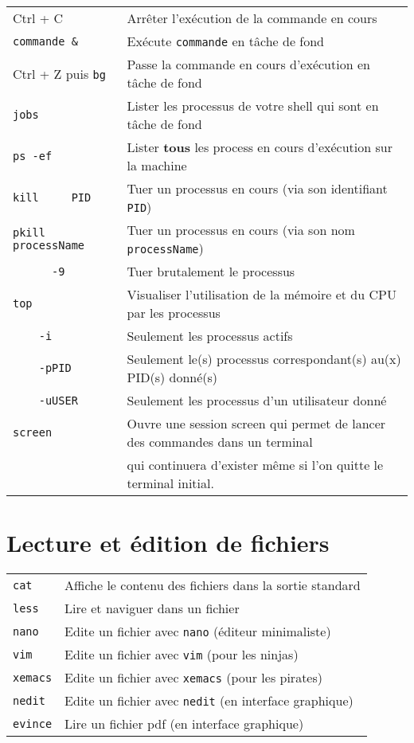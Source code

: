 \documentclass [a4paper]{article}
\begin{document}
\noindent
\begin{tabular}{ ll }
\hline
{Ctrl + C}                    & Arrêter l'exécution de la commande en cours \\
\verb+commande &+             & Exécute \verb+commande+ en tâche de fond \\
{Ctrl + Z puis \verb+bg+}     & Passe la commande en cours d'exécution en tâche de fond \\
{\verb+jobs+}                 & Lister les processus de votre shell qui sont en tâche de fond \\
{\verb+ps -ef+}               & Lister \textbf{tous} les process en cours d'exécution sur la machine \\
{\verb+kill     PID+}         & Tuer un processus en cours (via son identifiant \verb+PID+)\\
{\verb+pkill    processName+} & Tuer un processus en cours (via son nom \verb+processName+)\\
{\verb+      -9  + }          & Tuer brutalement le processus\\
{\verb+top+}                  & Visualiser l'utilisation de la mémoire et du CPU par les processus\\
{\verb+    -i +}              & Seulement les processus actifs\\
{\verb+    -pPID+}            & Seulement le(s) processus correspondant(s) au(x) PID(s) donné(s)\\
{\verb+    -uUSER+}           & Seulement les processus d'un utilisateur donné\\
{\verb+screen+}               & Ouvre une session screen qui permet de lancer des commandes dans un terminal \\
                              & qui continuera d'exister même si l'on quitte le terminal initial.\\
\hline
\end{tabular}


\section*{Lecture et édition de fichiers}

\noindent
\begin{tabular}{ ll }
\hline
{\verb+cat+}    & Affiche le contenu des fichiers dans la sortie standard\\
{\verb+less+}   & Lire et naviguer dans un fichier\\
{\verb+nano+}   & Edite un fichier avec \verb+nano+ (éditeur minimaliste)\\
{\verb+vim+}    & Edite un fichier avec \verb+vim+ (pour les ninjas)\\
{\verb+xemacs+} & Edite un fichier avec \verb+xemacs+ (pour les pirates)\\
{\verb+nedit+}  & Edite un fichier avec \verb+nedit+ (en interface graphique)\\
{\verb+evince+} & Lire un fichier pdf (en interface graphique)\\
\hline
\end{tabular}
\end{document}
